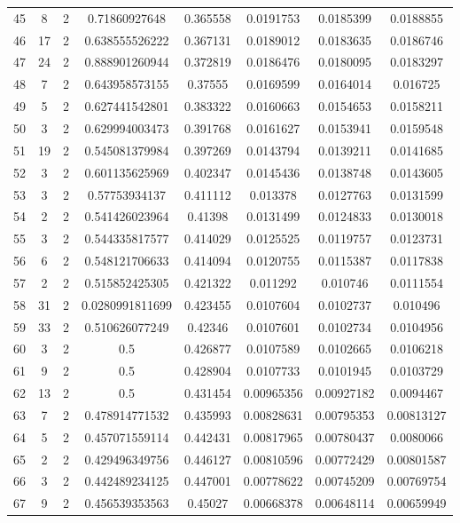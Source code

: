 \begin{longtable}{|c|c|c|c|c|c|c|c|}
45 & 8 & 2 & 0.71860927648 & 0.365558 & 0.0191753 & 0.0185399 & 0.0188855 \\
46 & 17 & 2 & 0.638555526222 & 0.367131 & 0.0189012 & 0.0183635 & 0.0186746 \\
47 & 24 & 2 & 0.888901260944 & 0.372819 & 0.0186476 & 0.0180095 & 0.0183297 \\
48 & 7 & 2 & 0.643958573155 & 0.37555 & 0.0169599 & 0.0164014 & 0.016725 \\
49 & 5 & 2 & 0.627441542801 & 0.383322 & 0.0160663 & 0.0154653 & 0.0158211 \\
50 & 3 & 2 & 0.629994003473 & 0.391768 & 0.0161627 & 0.0153941 & 0.0159548 \\
51 & 19 & 2 & 0.545081379984 & 0.397269 & 0.0143794 & 0.0139211 & 0.0141685 \\
52 & 3 & 2 & 0.601135625969 & 0.402347 & 0.0145436 & 0.0138748 & 0.0143605 \\
53 & 3 & 2 & 0.57753934137 & 0.411112 & 0.013378 & 0.0127763 & 0.0131599 \\
54 & 2 & 2 & 0.541426023964 & 0.41398 & 0.0131499 & 0.0124833 & 0.0130018 \\
55 & 3 & 2 & 0.544335817577 & 0.414029 & 0.0125525 & 0.0119757 & 0.0123731 \\
56 & 6 & 2 & 0.548121706633 & 0.414094 & 0.0120755 & 0.0115387 & 0.0117838 \\
57 & 2 & 2 & 0.515852425305 & 0.421322 & 0.011292 & 0.010746 & 0.0111554 \\
58 & 31 & 2 & 0.0280991811699 & 0.423455 & 0.0107604 & 0.0102737 & 0.010496 \\
59 & 33 & 2 & 0.510626077249 & 0.42346 & 0.0107601 & 0.0102734 & 0.0104956 \\
60 & 3 & 2 & 0.5 & 0.426877 & 0.0107589 & 0.0102665 & 0.0106218 \\
61 & 9 & 2 & 0.5 & 0.428904 & 0.0107733 & 0.0101945 & 0.0103729 \\
62 & 13 & 2 & 0.5 & 0.431454 & 0.00965356 & 0.00927182 & 0.0094467 \\
63 & 7 & 2 & 0.478914771532 & 0.435993 & 0.00828631 & 0.00795353 & 0.00813127 \\
64 & 5 & 2 & 0.457071559114 & 0.442431 & 0.00817965 & 0.00780437 & 0.0080066 \\
65 & 2 & 2 & 0.429496349756 & 0.446127 & 0.00810596 & 0.00772429 & 0.00801587 \\
66 & 3 & 2 & 0.442489234125 & 0.447001 & 0.00778622 & 0.00745209 & 0.00769754 \\
67 & 9 & 2 & 0.456539353563 & 0.45027 & 0.00668378 & 0.00648114 & 0.00659949 \\

\end{longtable}
